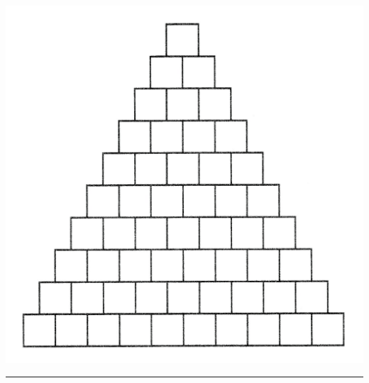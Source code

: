 \begin{center}
\includegraphics[scale=0.125]{Imatges/figuraE16-12.jpg} 
\end{center}
\noindent
\rule{\textwidth}{3pt}

